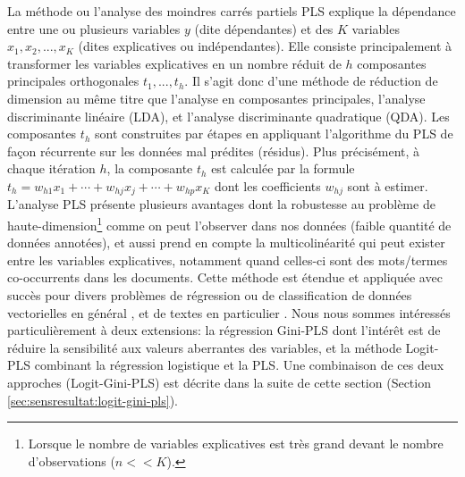 La méthode ou l'analyse des moindres carrés partiels PLS  \citep{wold1966pls} explique la dépendance entre une ou plusieurs variables $y$ (dite dépendantes) et des $K$ variables $x_1,x_2,...,x_K$ (dites explicatives ou indépendantes). Elle consiste principalement à transformer les variables explicatives en un nombre réduit de $h$ composantes principales orthogonales $t_1, ..., t_h$. Il s'agit donc d'une méthode de réduction de dimension au même titre que l'analyse en composantes principales, l'analyse discriminante linéaire (LDA), et l'analyse discriminante quadratique (QDA). Les composantes $t_h$ sont construites par étapes en appliquant l'algorithme du PLS de façon récurrente sur les données mal prédites (résidus). Plus précisément, à chaque itération $h$, la composante $t_h$ est calculée par la formule $t_h = w_{h1} x_1 + \cdots + w_{hj} x_j + \cdots + w_{hp} x_K$ dont les coefficients $w_{hj}$ sont à estimer. L'analyse PLS présente plusieurs avantages \citep{lacroux2011avantagesPLS} dont la robustesse au problème de haute-dimension\footnote{Lorsque le nombre de variables explicatives est très grand devant le nombre d'observations ($n << K$).} comme on peut l'observer dans nos données (faible quantité de données annotées), et aussi prend en compte la multicolinéarité qui peut exister entre les variables explicatives, notamment quand celles-ci sont des mots/termes co-occurrents dans les documents. Cette méthode est étendue et appliquée avec succès pour divers problèmes de régression \citep{lacroux2011avantagesPLS}
 ou de  classification de données vectorielles en général \citep{liu2007pls4classif,durif2017sparsePLSandLogit, bazzoli2018classificationwithLS-PLS}, et de textes en particulier \citep{zeng2007textclassPLS}.
Nous nous sommes intéressés particulièrement à deux extensions: la régression Gini-PLS \citep{mussard2018ginipls} dont l'intérêt est de réduire la sensibilité aux valeurs aberrantes des variables, et la méthode Logit-PLS \citep{tenenhaus2005logitpls} combinant la régression logistique et la PLS. Une combinaison de ces deux approches (Logit-Gini-PLS) est décrite dans la suite de cette section (Section \ref{sec:sensresultat:logit-gini-pls}).


